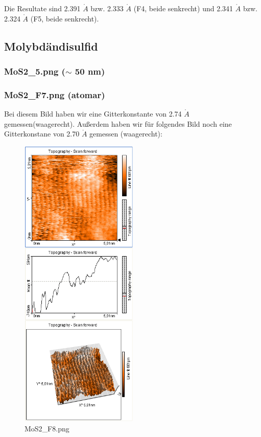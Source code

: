 Die Resultate sind 2.391 $\mathring{A}$ bzw. 2.333 $\mathring{A}$ (F4, beide senkrecht) und 2.341 $\mathring{A}$ bzw. 2.324 $\mathring{A}$ (F5, beide senkrecht).

\subsection{Molybdändisulfid}

\subsubsection{MoS2\_5.png ($\sim$ 50 nm)}
\subsubsection{MoS2\_F7.png (atomar)}

Bei diesem Bild haben wir eine Gitterkonstante von 2.74 $\mathring{A}$ gemessen(waagerecht). Außerdem  haben wir für folgendes Bild noch eine Gitterkonstane von 2.70 $\mathring{A}$ gemessen (waagerecht):

\begin{figure}[H]
	\centering \includegraphics*[viewport= 5 528 322 825 , width = 0.5\textwidth]{messwerte/Freitag/MoS2_F8.png}
	\caption{MoS2\_F8.png}
	\end{figure}